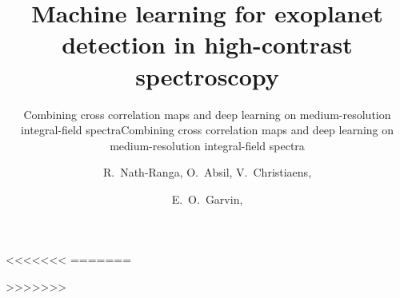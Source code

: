 \documentclass{aa}
\begin{document}
 


   \title{Machine learning for exoplanet detection in high-contrast spectroscopy} 
<<<<<<<
=======
   \subtitle{Combining cross correlation maps and deep learning on medium-resolution integral-field spectra} %
>>>>>>>
   \subtitle{Combining cross correlation maps and deep learning on medium-resolution integral-field spectra} %



   \author{R.~Nath-Ranga,
          O.~Absil,
          V.~Christiaens,
          \and
          E.~O.~Garvin,
          }



 
\end{document}
